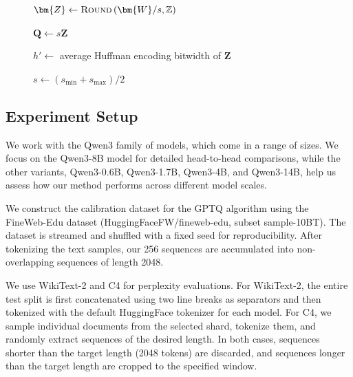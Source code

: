 \documentclass{article} %
\begin{document}
\begin{figure}[!ht]
\begin{minipage}[t]{\linewidth}
\begin{algorithm}[H]
{$\bm{Z} \leftarrow \textsc{Round} \left( \bm{W} / s, \mathbb{Z} \right)$

$\bm{Q} \leftarrow s \bm{Z}$

$h' \leftarrow$ average Huffman encoding bitwidth of $\bm{Z}$


$s \leftarrow \left( s_{\mathrm{min}} + s_{\mathrm{max}} \right) / 2$

}

\end{algorithm}
\end{minipage}
\end{figure}

\clearpage

\subsection{Experiment Setup}
\label{sec:app_experiments_setup}

We work with the Qwen3 family of models, which come in a range of sizes. We focus on the Qwen3-8B model for detailed head-to-head comparisons, while the other variants, Qwen3-0.6B, Qwen3-1.7B, Qwen3-4B, and Qwen3-14B, help us assess how our method performs across different model scales.

We construct the calibration dataset for the GPTQ algorithm using the FineWeb-Edu dataset (HuggingFaceFW/fineweb-edu, subset sample-10BT). The dataset is streamed and shuffled with a fixed seed for reproducibility. After tokenizing the text samples, our 256 sequences are accumulated into non-overlapping sequences of length 2048.

We use WikiText-2 and C4 for perplexity evaluations. For WikiText-2, the entire test split is first concatenated using two line breaks as separators and then tokenized with the default HuggingFace tokenizer for each model. For C4, we sample individual documents from the selected shard, tokenize them, and randomly extract sequences of the desired length. In both cases, sequences shorter than the target length (2048 tokens) are discarded, and sequences longer than the target length are cropped to the specified window.
\end{document}
